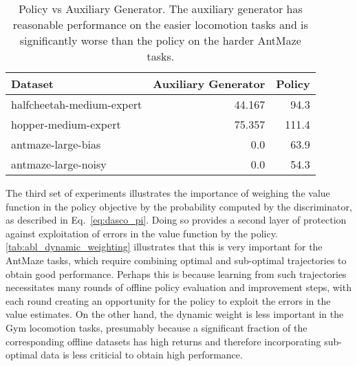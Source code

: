 \begin{table}[!htp]\centering
\caption{Policy vs Auxiliary Generator. The auxiliary generator has reasonable performance on the easier locomotion tasks and is significantly worse than the policy on the harder AntMaze tasks.}\label{tab:policy_vs_aux}
\small
\begin{tabular}{l||rr}
Dataset & Auxiliary Generator & Policy \\ \hline

halfcheetah-medium-expert & 44.167 & 94.3 \\
hopper-medium-expert & 75.357 & 111.4 \\

antmaze-large-bias & 0.0 & 63.9 \\

antmaze-large-noisy  & 0.0  & 54.3 \\


\end{tabular}
\end{table}


The third set of experiments illustrates the importance of weighing the value function in the policy objective by the probability computed by the discriminator, as described in Eq.~\ref{eq:dasco_pi}. Doing so provides a second layer of protection against exploitation of  errors in the value function by the policy. \autoref{tab:abl_dynamic_weighting} illustrates that this is very important for the AntMaze tasks, which require combining optimal and sub-optimal trajectories to obtain good performance. Perhaps this is because learning from such trajectories necessitates many rounds of offline policy evaluation and improvement steps, with each round creating an opportunity for the policy to exploit the errors in the value estimates. 
On the other hand, the dynamic weight is less important in the Gym locomotion tasks, presumably because a significant fraction of the corresponding offline datasets has high returns and therefore incorporating sub-optimal data is less criticial to obtain high performance.

